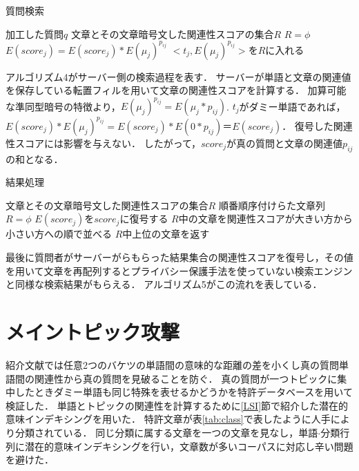 \documentclass{jsarticle}
\theoremstyle{definition}
\begin{document}
\begin{algorithm}
\caption{質問検索}
\begin{algorithmic}[1]
	\Require 加工した質問$q$
	\Ensure 文章とその文章暗号文した関連性スコアの集合$R$
	\State $R=\phi$
		\State $E(score_j)=E(score_j)*E(\mu_j)^{p_{ij}}$
		\Else 
		\State $<t_j,E(\mu_j)^{p_{ij}}>$を$R$に入れる
		\EndIf
		\EndFor
	\EndFor
\EndFunction
\end{algorithmic}
\end{algorithm}

アルゴリズム4がサーバー側の検索過程を表す．
サーバーが単語と文章の関連値を保存している転置フィルを用いて文章の関連性スコアを計算する．
加算可能な準同型暗号の特徴より，$E(\mu_j)^{p_{ij}}=E(\mu_j*p_{ij})$.
$t_j$がダミー単語であれば，$E(score_j)*E(\mu_j)^{p_{ij}}=E(score_j)*E(0*p_{ij})＝E(score_j)$．
復号した関連性スコアには影響を与えない．
したがって，$score_j$が真の質問と文章の関連値$p_{ij}$の和となる．

\begin{algorithm}
\caption{結果処理}
\begin{algorithmic}[1]
	\Require 文章とその文章暗号文した関連性スコアの集合$R$
	\Ensure 順番順序付けらた文章列
	\State $R=\phi$
		\State $E(score_j)$を$score_j$に復号する
	\EndFor
	\State $R$中の文章を関連性スコアが大きい方から小さい方への順で並べる
	\State $R$中上位の文章を返す
\EndFunction
\end{algorithmic}
\end{algorithm}

最後に質問者がサーバーがらもらった結果集合の関連性スコアを復号し，その値を用いて文章を再配列するとプライバシー保護手法を使っていない検索エンジンと同様な検索結果がもらえる．
アルゴリズム5がこの流れを表している．

\section{メイントピック攻撃}
紹介文献では任意2つのバケツの単語間の意味的な距離の差を小くし真の質問単語間の関連性から真の質問を見破ることを防ぐ．
真の質問が一つトピックに集中したときダミー単語も同じ特殊を表せるかどうかを特許データベース\cite{}を用いて検証した．
単語とトピックの関連性を計算するために\ref{LSI}節で紹介した潜在的意味インデキシングを用いた．
特許文章が表\ref{tab:class}で表したように人手により分類されている．
同じ分類に属する文章を一つの文章を見なし，単語$\cdot$分類行列に潜在的意味インデキシングを行い，文章数が多いコーパスに対応し辛い問題を避けた．
\end{document}
